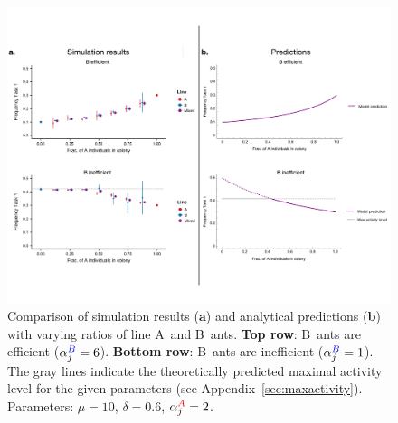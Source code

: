 \documentclass[11pt]{article}
\newcommand{\A}{{\color{red}A}}
\newcommand{\B}{{\color{blue}B}}
\begin{document}
\begin{figure}[H]
    \centering
    \includegraphics[trim={0 1.1in 0 1.1in},clip,width=0.95\linewidth]{doc/mixes_comparison.pdf}
    \caption{Comparison of simulation results (\textbf{a}) and analytical predictions (\textbf{b}) with varying ratios of line \A\ and \B\ ants. \textbf{Top row}: \B\ ants are efficient ($\alpha_j^{\B}=6$). \textbf{Bottom row}: \B\ ants are inefficient ($\alpha_j^{\B}=1$). The gray lines indicate the theoretically predicted maximal activity level for the given parameters (see Appendix~\ref{sec:maxactivity}).
    Parameters: $\mu = 10$, $\delta = 0.6$, $\alpha_j^{\A} = 2$. }
    \label{fig:mixescomp}
\end{figure}
\end{document}
